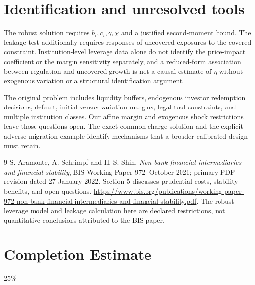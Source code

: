 \documentclass[11pt,a4paper]{article}
\theoremstyle{remark}
\begin{document}
\section{Identification and unresolved tools}
The robust solution requires $b_i,c_i,\gamma,\chi$ and a justified second-moment bound. The leakage test additionally requires responses of uncovered exposures to the covered constraint. Institution-level leverage data alone do not identify the price-impact coefficient or the margin sensitivity separately, and a reduced-form association between regulation and uncovered growth is not a causal estimate of $\eta$ without exogenous variation or a structural identification argument.

The original problem includes liquidity buffers, endogenous investor redemption decisions, default, initial versus variation margins, legal tool constraints, and multiple institution classes. Our affine margin and exogenous shock restrictions leave those questions open. The exact common-charge solution and the explicit adverse migration example identify mechanisms that a broader calibrated design must retain.

\begin{thebibliography}{9}
 S. Aramonte, A. Schrimpf and H. S. Shin, \emph{Non-bank financial intermediaries and financial stability}, BIS Working Paper 972, October 2021; primary PDF revision dated 27 January 2022. Section 5 discusses prudential costs, stability benefits, and open questions. \url{https://www.bis.org/publications/working-paper-972-non-bank-financial-intermediaries-and-financial-stability.pdf}. The robust leverage model and leakage calculation here are declared restrictions, not quantitative conclusions attributed to the BIS paper.
\end{thebibliography}

\section{Completion Estimate}
25\%
\end{document}

